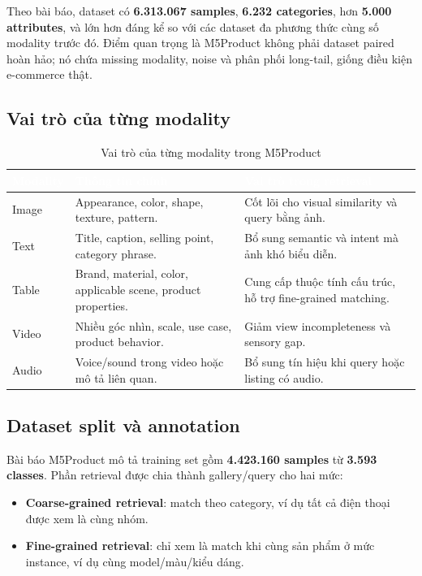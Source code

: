 \documentclass[12pt,a4paper]{article}
\begin{document}
Theo bài báo, dataset có \textbf{6.313.067 samples}, \textbf{6.232 categories}, hơn \textbf{5.000 attributes}, và lớn hơn đáng kể so với các dataset đa phương thức cùng số modality trước đó. Điểm quan trọng là M5Product không phải dataset paired hoàn hảo; nó chứa missing modality, noise và phân phối long-tail, giống điều kiện e-commerce thật.

\subsection{Vai trò của từng modality}
\begin{table}[htbp]
\centering
\begin{tabularx}{\linewidth}{@{}L{2cm}YY@{}}
\toprule
{}
\textcolor{white}{\textbf{Modality}} & \textcolor{white}{\textbf{Thông tin chính}} & \textcolor{white}{\textbf{Vai trò trong retrieval}} \\
\midrule
Image & Appearance, color, shape, texture, pattern. & Cốt lõi cho visual similarity và query bằng ảnh. \\
Text & Title, caption, selling point, category phrase. & Bổ sung semantic và intent mà ảnh khó biểu diễn. \\
Table & Brand, material, color, applicable scene, product properties. & Cung cấp thuộc tính cấu trúc, hỗ trợ fine-grained matching. \\
Video & Nhiều góc nhìn, scale, use case, product behavior. & Giảm view incompleteness và sensory gap. \\
Audio & Voice/sound trong video hoặc mô tả liên quan. & Bổ sung tín hiệu khi query hoặc listing có audio. \\
\bottomrule
\end{tabularx}
\caption{Vai trò của từng modality trong M5Product}
\end{table}

\subsection{Dataset split và annotation}
Bài báo M5Product mô tả training set gồm \textbf{4.423.160 samples} từ \textbf{3.593 classes}. Phần retrieval được chia thành gallery/query cho hai mức:
\begin{itemize}
  \item \textbf{Coarse-grained retrieval}: match theo category, ví dụ tất cả điện thoại được xem là cùng nhóm.
  \item \textbf{Fine-grained retrieval}: chỉ xem là match khi cùng sản phẩm ở mức instance, ví dụ cùng model/màu/kiểu dáng.
\end{itemize}
\end{document}
